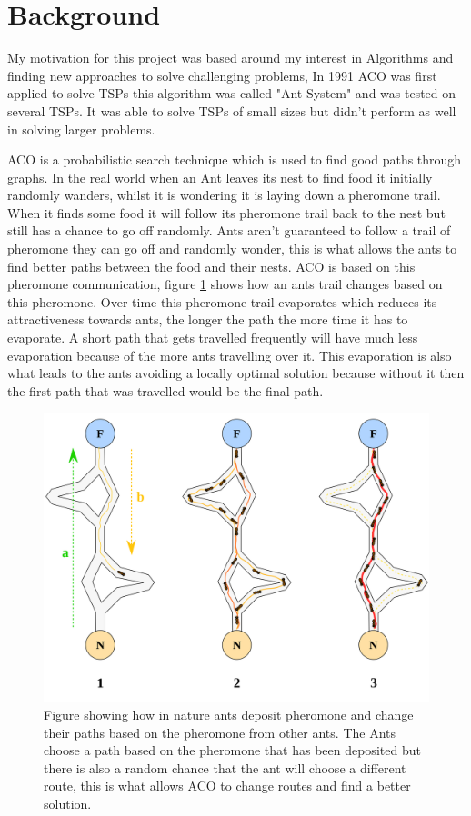 \section{Background}
My motivation for this project was based around my interest in Algorithms and finding new approaches to solve challenging problems, In 1991 ACO was first applied to solve TSPs\cite{dorigo1991distributed} this algorithm was called "Ant System" and was tested on several TSPs. It was able to solve TSPs of small sizes but didn't perform as well in solving larger problems. 

ACO is a probabilistic search technique which is used to find good paths through graphs. In the real world when an Ant leaves its nest to find food it initially randomly wanders, whilst it is wondering it is laying down a pheromone trail. When it finds some food it will follow its pheromone trail back to the nest but still has a chance to go off randomly. Ants aren't guaranteed to follow a trail of pheromone they can go off and randomly wonder, this is what allows the ants to find better paths between the food and their nests. ACO is based on this pheromone communication, figure \ref{fig:aco_pheremone_example} shows how an ants trail changes based on this pheromone. Over time this pheromone trail evaporates which reduces its attractiveness towards ants, the longer the path the more time it has to evaporate. A short path that gets travelled frequently will have much less evaporation because of the more ants travelling over it. This evaporation is also what leads to the ants avoiding a locally optimal solution because without it then the first path that was travelled would be the final path.

\begin{figure}
    \centering
    \includegraphics[width=\textwidth]{figures/aco_pheremone_demo.png}
    \caption{Figure showing how in nature ants deposit pheromone and change their paths based on the pheromone from other ants. The Ants choose a path based on the pheromone that has been deposited but there is also a random chance that the ant will choose a different route, this is what allows ACO to change routes and find a better solution.}
    \label{fig:aco_pheremone_example}
\end{figure}

